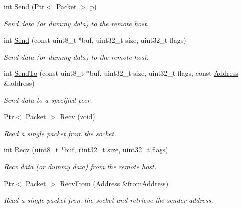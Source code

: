 \begin{DoxyCompactItemize}
int \hyperlink{classns3_1_1Socket_a3c439c8d005bf0fdd2480c93a0e8056c}{Send} (\hyperlink{classns3_1_1Ptr}{Ptr}$<$ \hyperlink{classns3_1_1Packet}{Packet} $>$ \hyperlink{lte__link__budget__x2__handover__measures_8m_ac9de518908a968428863f829398a4e62}{p})
\begin{DoxyCompactList}\small\item\em Send data (or dummy data) to the remote host. \end{DoxyCompactList}\item 
int \hyperlink{classns3_1_1Socket_a7d3e39f4919684bc49ed785c6e868317}{Send} (const uint8\+\_\+t $\ast$buf, uint32\+\_\+t size, uint32\+\_\+t flags)
\begin{DoxyCompactList}\small\item\em Send data (or dummy data) to the remote host. \end{DoxyCompactList}\item 
int \hyperlink{classns3_1_1Socket_a9bda45c361e220b813a1d96a9862a086}{Send\+To} (const uint8\+\_\+t $\ast$buf, uint32\+\_\+t size, uint32\+\_\+t flags, const \hyperlink{classns3_1_1Address}{Address} \&address)
\begin{DoxyCompactList}\small\item\em Send data to a specified peer. \end{DoxyCompactList}\item 
\hyperlink{classns3_1_1Ptr}{Ptr}$<$ \hyperlink{classns3_1_1Packet}{Packet} $>$ \hyperlink{classns3_1_1Socket_afb4e211a54a3f63ac3f79624a3a964f7}{Recv} (void)
\begin{DoxyCompactList}\small\item\em Read a single packet from the socket. \end{DoxyCompactList}\item 
int \hyperlink{classns3_1_1Socket_a9ef80ed0d09f8286a4c5f7a0d3661b34}{Recv} (uint8\+\_\+t $\ast$buf, uint32\+\_\+t size, uint32\+\_\+t flags)
\begin{DoxyCompactList}\small\item\em Recv data (or dummy data) from the remote host. \end{DoxyCompactList}\item 
\hyperlink{classns3_1_1Ptr}{Ptr}$<$ \hyperlink{classns3_1_1Packet}{Packet} $>$ \hyperlink{classns3_1_1Socket_af2ab3105531eff54b0ebff795ec2631a}{Recv\+From} (\hyperlink{classns3_1_1Address}{Address} \&from\+Address)
\begin{DoxyCompactList}\small\item\em Read a single packet from the socket and retrieve the sender address. \end{DoxyCompactList}\item 

\end{DoxyCompactItemize}
